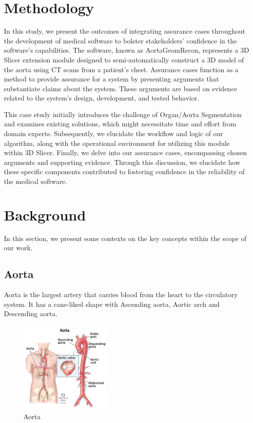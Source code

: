 \section{Methodology} \label{methodology}
In this study, we present the outcomes of integrating assurance cases throughout the development of medical software to bolster stakeholders' confidence in the software's capabilities. The software, known as AortaGeomRecon, represents a 3D Slicer extension module designed to semi-automatically construct a 3D model of the aorta using CT scans from a patient's chest. Assurance cases function as a method to provide assurance for a system by presenting arguments that substantiate claims about the system. These arguments are based on evidence related to the system's design, development, and tested behavior.

This case study initially introduces the challenge of Organ/Aorta Segmentation and examines existing solutions, which might necessitate time and effort from domain experts. Subsequently, we elucidate the workflow and logic of our algorithm, along with the operational environment for utilizing this module within 3D Slicer. Finally, we delve into our assurance cases, encompassing chosen arguments and supporting evidence. Through this discussion, we elucidate how these specific components contributed to fostering confidence in the reliability of the medical software.

\section{Background} \label{bg}

In this section, we present some contexts on the key concepts within the scope of our work.

\subsection{Aorta}
Aorta is the largest artery that carries blood from the heart to the circulatory system. It has a cane-liked shape with Ascending aorta, Aortic arch and Descending aorta. 

\begin{figure}[ht]
    \centering
    \includegraphics[width=0.4\textwidth]{figures/Intro/Aorta.png}
    \caption[Aorta]{Aorta}
    \label{fig_aorta}
\end{figure}

